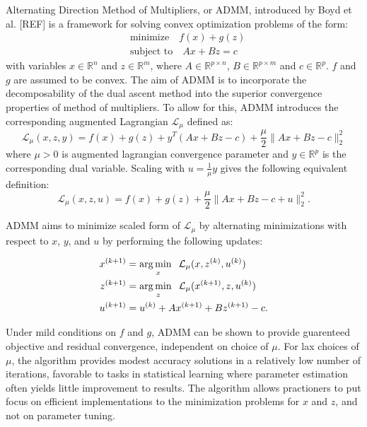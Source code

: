 Alternating Direction Method of Multipliers, or ADMM, introduced by Boyd et al. [REF] is a framework for solving convex optimization problems of the form:
\begin{equation}
    \label{admm:prob}
    \begin{aligned}
    &\text{minimize} \quad f(x) + g(z) \\
    &\text{subject to} \quad Ax + Bz = c
    \end{aligned}
\end{equation}
with variables $x \in \mathbb{R}^{n}$ and $z \in \mathbb{R}^{m}$, where $A \in \mathbb{R}^{p \times n}$, $B \in \mathbb{R}^{p \times m}$ and $c \in \mathbb{R}^{p}$. $f$ and $g$ are assumed to be convex. The aim of ADMM is to incorporate the decomposability of the dual ascent method into the superior convergence properties of method of multipliers. To allow for this, ADMM introduces the corresponding augmented Lagrangian $\mathcal{L}_{\mu}$ defined as:
\begin{equation}
    \label{admm:lagrangian}
    \mathcal{L}_{\mu}(x,z,y) = f(x) + g(z) + y^T(Ax + Bz - c) + \frac{\mu}{2} \|Ax + Bz - c\|_2^2
\end{equation}
where $\mu > 0$ is augmented lagrangian convergence parameter and $y \in \mathbb{R}^{p}$ is the corresponding dual variable. Scaling with $u  = \frac{1}{\mu} y $ gives the following equivalent definition: 
\begin{equation}
    \label{admm:lagrangian-real}
    \mathcal{L}_{\mu}(x,z,u) = f(x) + g(z) + \frac{\mu}{2} \|Ax + Bz - c + u\|_2^2.
\end{equation}

ADMM aims to minimize scaled form of $\mathcal{L}_{\mu}$ by alternating minimizations with respect to $x$, $y$, and $u$ by performing the following updates:

\begin{equation}
    \label{admm:updates}
    \begin{aligned}
        x^{(k+1)} &= \operatorname*{arg\,min \;\;}_{x} \mathcal{L}_{\mu}(x,z^{(k)},u^{(k)})  \\
        z^{(k+1)} &= \operatorname*{arg\,min \;\;}_{z} \mathcal{L}_{\mu}(x^{(k+1)},z,u^{(k)}) \\
        u^{(k+1)} &= u^{(k)} + Ax^{(k+1)} + Bz^{(k+1)} - c.
    \end{aligned} 
\end{equation}

Under mild conditions on $f$ and $g$, ADMM can be shown to provide guarenteed objective and residual convergence, independent on choice of $\mu$. For lax choices of $\mu$, the algorithm provides modest accuracy solutions in a relatively low number of iterations, favorable to tasks in statistical learning where parameter estimation often yields little improvement to results. The algorithm allows practioners to put focus on efficient implementations to the minimization problems for $x$ and $z$, and not on parameter tuning.

